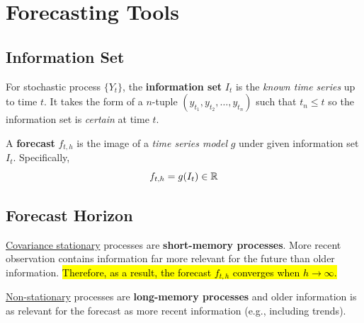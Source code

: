 \documentclass[11pt]{article}
\begin{document}
	\section{Forecasting Tools}
	\subsection{Information Set}
		\begin{definition}
			For stochastic process $\{Y_t\}$, the \textbf{information set} $I_t$ is the \emph{known time series} up to time $t$. It takes the form of a $n$-tuple $(y_{t_1}, y_{t_2}, \dots, y_{t_n})$ such that $t_n \leq t$ so the information set is \emph{certain} at time $t$.
		\end{definition}
		
		\begin{definition}
			A \textbf{forecast} $f_{t, h}$ is the image of a \emph{time series model} $g$ under given information set $I_t$. Specifically,
			\begin{equation}
				f_{t, h} = g(I_t) \in \mathbb{R}
			\end{equation}
		\end{definition}
	\subsection{Forecast Horizon}
		\begin{remark}
			\ul{Covariance stationary} processes are \textbf{short-memory processes}. More recent observation contains information far more relevant for the future than older information. \hl{Therefore, as a result, the forecast $f_{t, h}$ converges when $h \to \infty$.}
		\end{remark}
		
		\begin{remark}
			\ul{Non-stationary} processes are \textbf{long-memory processes} and older information is as relevant for the forecast as more recent information (e.g., including trends).
		\end{remark}
\end{document}

